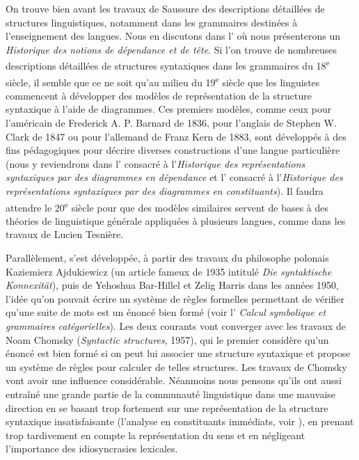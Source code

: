 {    On trouve bien avant les travaux de Saussure des descriptions détaillées de structures linguistiques, notamment dans les grammaires destinées à l’enseignement des langues. Nous en discutons dans l’ où nous présenterons un \textit{Historique des notions de dépendance et de tête}. Si l’on trouve de nombreuses descriptions détaillées de structures syntaxiques dans les grammaires du 18\textsuperscript{e} siècle, il semble que ce ne soit qu’au milieu du 19\textsuperscript{e} siècle que les linguistes commencent à développer des modèles de représentation de la structure syntaxique à l’aide de diagrammes. Ces premiers modèles, comme ceux pour l’américain de Frederick A. P. Barnard de 1836, pour l’anglais de Stephen W. Clark de 1847 ou pour l’allemand de Franz Kern de 1883, sont développés à des fins pédagogiques pour décrire diverses constructions d’une langue particulière (nous y reviendrons dans l’ consacré à l’\textit{Historique des représentations syntaxiques par des diagrammes en dépendance} et l’ consacré à l’\textit{Historique des représentations syntaxiques par des diagrammes en constituants}). Il faudra attendre le 20\textsuperscript{e} siècle pour que des modèles similaires servent de bases à des théories de linguistique générale appliquées à plusieurs langues, comme dans les travaux de Lucien Tesnière.

    Parallèlement, s’est développée, à partir des travaux du philosophe polonais Kaziemierz Ajdukiewicz (un article fameux de 1935 intitulé \textit{Die syntaktische Konnexität}), puis de Yehoshua Bar-Hillel et Zelig Harris dans les années 1950, l’idée qu’on pouvait écrire un système de règles formelles permettant de vérifier qu’une suite de mots est un énoncé bien formé (voir l’ \textit{Calcul symbolique et grammaires catégorielles}). Les deux courants vont converger avec les travaux de Noam Chomsky (\textit{Syntactic structures}, 1957), qui le premier considère qu’un énoncé est bien formé si on peut lui associer une structure syntaxique et propose un système de règles pour calculer de telles structures. Les travaux de Chomsky vont avoir une influence considérable. Néanmoins nous pensons qu’ils ont aussi entraîné une grande partie de la communauté linguistique dans une mauvaise direction en se basant trop fortement sur une représentation de la structure syntaxique insatisfaisante (l’analyse en constituants immédiats, voir ), en prenant trop tardivement en compte la représentation du sens et en négligeant l’importance des idiosyncrasies lexicales.
}

